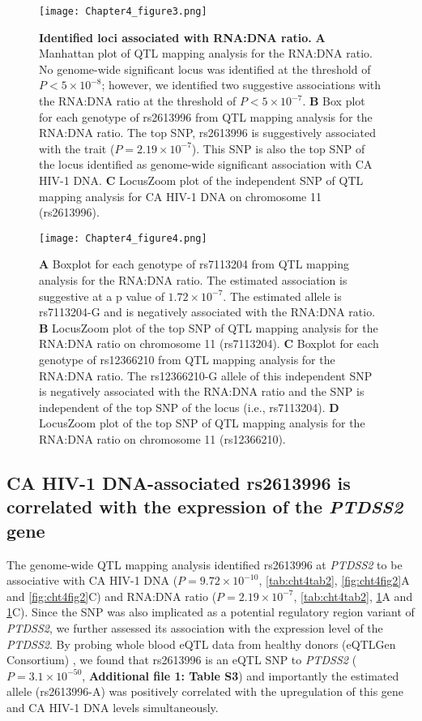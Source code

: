 \documentclass{book}
\begin{document}
\begin{refsection}
\begin{figure}
  \texttt{[image: Chapter4\_figure3.png]}
  \caption{
    \label{fig:cht4fig3} \textbf{Identified loci associated with RNA:DNA ratio.}
    \textbf{A} Manhattan plot of QTL mapping analysis for the RNA:DNA ratio. No genome-wide significant locus was identified at the threshold of $P < 5 \times 10^{-8}$; however, we identified two suggestive associations with the RNA:DNA ratio at the threshold of $P < 5 \times 10^{-7}$.
    \textbf{B} Box plot for each genotype of rs2613996 from QTL mapping analysis for the RNA:DNA ratio. The top SNP, rs2613996 is suggestively associated with the trait ($P = 2.19 \times 10^{-7}$). This SNP is also the top SNP of the locus identified as genome-wide significant association with CA HIV-1 DNA.
    \textbf{C} LocusZoom plot of the independent SNP of QTL mapping analysis for CA HIV-1 DNA on chromosome 11 (rs2613996).
  }
\end{figure}

\begin{figure}
  \texttt{[image: Chapter4\_figure4.png]}
  \caption{
    \label{fig:cht4fig4} \textbf{}
    \textbf{A} Boxplot for each genotype of rs7113204 from QTL mapping analysis for the RNA:DNA ratio. The estimated association is suggestive at a p value of $1.72 \times 10^{-7}$. The estimated allele is rs7113204-G and is negatively associated with the RNA:DNA ratio.
    \textbf{B} LocusZoom plot of the top SNP of QTL mapping analysis for the RNA:DNA ratio on chromosome 11 (rs7113204).
    \textbf{C} Boxplot for each genotype of rs12366210 from QTL mapping analysis for the RNA:DNA ratio. The rs12366210-G allele of this independent SNP is negatively associated with the RNA:DNA ratio and the SNP is independent of the top SNP of the locus (i.e., rs7113204).
    \textbf{D} LocusZoom plot of the top SNP of QTL mapping analysis for the RNA:DNA ratio on chromosome 11 (rs12366210).
  }
\end{figure}

\subsection*{CA HIV-1 DNA-associated rs2613996 is correlated with the expression of the \textit{PTDSS2} gene}
The genome-wide QTL mapping analysis identified rs2613996 at \textit{PTDSS2} to be associative with CA HIV-1 DNA ($P = 9.72 \times 10^{-10}$, \ref{tab:cht4tab2}, \ref{fig:cht4fig2}A and \ref{fig:cht4fig2}C) and RNA:DNA ratio ($P = 2.19 \times 10^{-7}$, \ref{tab:cht4tab2}, \ref{fig:cht4fig3}A and \ref{fig:cht4fig3}C).
Since the SNP was also implicated as a potential regulatory region variant of \textit{PTDSS2}, we further assessed its association with the expression level of the \textit{PTDSS2}.
By probing whole blood eQTL data from healthy donors (eQTLGen Consortium) \cite{Võsa2018Unraveling}, we found that rs2613996 is an eQTL SNP to \textit{PTDSS2} ($P = 3.1 \times 10^{-50}$, \textbf{Additional file 1: Table S3}) and importantly the estimated allele (rs2613996-A) was positively correlated with the upregulation of this gene and CA HIV-1 DNA levels simultaneously.


\end{refsection}
\end{document}
